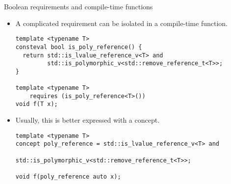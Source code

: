 \begin{frame}[t,fragile]{Boolean requirements and compile-time functions}
\begin{itemize}
  \item A complicated requirement can be isolated in a compile-time
        function.
\begin{lstlisting}
template <typename T>
consteval bool is_poly_reference() {
  return std::is_lvalue_reference_v<T> and
         std::is_polymorphic_v<std::remove_reference_t<T>>;
}

template <typename T>
    requires (is_poly_reference<T>())
void f(T x);
\end{lstlisting}

  \item Usually, this is better expressed with a concept.
\begin{lstlisting}
template <typename T>
concept poly_reference = std::is_lvalue_reference_v<T> and
                         std::is_polymorphic_v<std::remove_reference_t<T>>;

void f(poly_reference auto x);
\end{lstlisting}
\end{itemize}
\end{frame}
